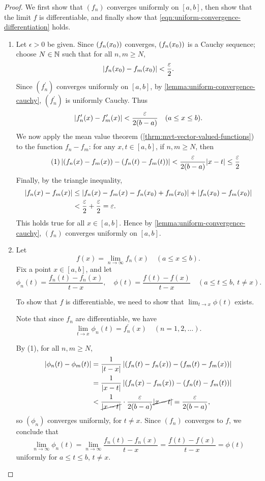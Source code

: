 \begin{proof}
We first show that $(f_n)$ converges uniformly on $[a,b]$, then show that the limit $f$ is differentiable, and finally show that \eqref{eqn:uniform-convergence-differentiation} holds.

\begin{enumerate}
\item Let $\epsilon>0$ be given. Since $\left(f_n(x_0)\right)$ converges, $\left(f_n(x_0)\right)$ is a Cauchy sequence; choose $N\in\mathbb N$ such that for all $n,m\ge N$,
\[\left|f_n(x_0)-f_m(x_0)\right|<\frac{\varepsilon}{2}.\]
Since $(f_n^\prime)$ converges uniformly on $[a,b]$, by \ref{lemma:uniform-convergence-cauchy}, $(f_n^\prime)$ is uniformly Cauchy. Thus
\[\left|f_n^\prime(x)-f_m^\prime(x)\right|<\frac{\varepsilon}{2(b-a)}\quad(a\le x\le b).\]
We now apply the mean value theorem (\ref{thrm:mvt-vector-valued-functions}) to the function $f_n-f_m$: for any $x,t\in[a,b]$, if $n,m\ge N$, then
\begin{equation*}\tag{1}
\left|\left(f_n(x)-f_m(x)\right)-\left(f_n(t)-f_m(t)\right)\right|
<\frac{\varepsilon}{2(b-a)}|x-t|
\le\frac{\varepsilon}{2}
\end{equation*}
Finally, by the triangle inequality,
\begin{align*}
|f_n(x)-f_m(x)|
&\le\left|f_n(x)-f_m(x)-f_n(x_0)+f_m(x_0)\right|+|f_n(x_0)-f_m(x_0)|\\
&<\frac{\varepsilon}{2}+\frac{\varepsilon}{2}=\varepsilon.
\end{align*}
This holds true for all $x\in[a,b]$. Hence by \ref{lemma:uniform-convergence-cauchy}, $(f_n)$ converges uniformly on $[a,b]$.

\item Let 
\[f(x)=\lim_{n\to\infty}f_n(x)\quad(a\le x\le b).\]
Fix a point $x\in[a,b]$, and let
\[\phi_n(t)=\frac{f_n(t)-f_n(x)}{t-x},\quad\phi(t)=\frac{f(t)-f(x)}{t-x}\quad(a\le t\le b,\:t\neq x).\]
\begin{idea}
To show that $f$ is differentiable, we need to show that $\displaystyle\lim_{t\to x}\phi(t)$ exists. 
\end{idea}
Note that since $f_n$ are differentiable, we have
\[\lim_{t\to x}\phi_n(t)=f_n^\prime(x)\quad(n=1,2,\dots).\]

By (1), for all $n,m\ge N$,
\begin{align*}
|\phi_n(t)-\phi_m(t)|
&=\frac{1}{|t-x|}\left|\left(f_n(t)-f_n(x)\right)-\left(f_m(t)-f_m(x)\right)\right|\\
&=\frac{1}{|x-t|}\left|\left(f_n(x)-f_m(x)\right)-\left(f_n(t)-f_m(t)\right)\right|\\
&<\frac{1}{\cancel{|x-t|}}\cdot\frac{\varepsilon}{2(b-a)}\cancel{|x-t|}=\frac{\varepsilon}{2(b-a)},
\end{align*}
so $(\phi_n)$ converges uniformly, for $t\neq x$. Since $(f_n)$ converges to $f$, we conclude that
\[\lim_{n\to\infty}\phi_n(t)
=\lim_{n\to\infty}\frac{f_n(t)-f_n(x)}{t-x}
=\frac{f(t)-f(x)}{t-x}
=\phi(t)\]
uniformly for $a\le t\le b$, $t\neq x$. 


\end{enumerate}
\end{proof}
